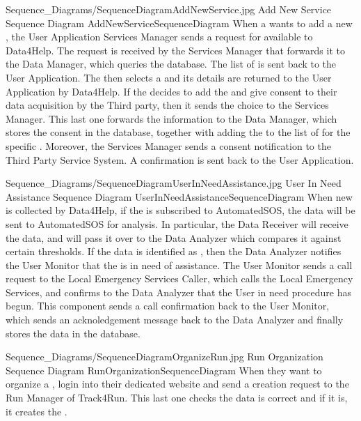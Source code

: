 \documentclass[../../DD.tex]{subfiles}
\begin{document}
	\image {13cm} {Sequence_Diagrams/SequenceDiagramAddNewService.jpg} {Add New Service Sequence Diagram} {AddNewServiceSequenceDiagram}
	When a  wants to add a new , the User Application Services Manager sends a request for available  to Data4Help. The request is received by the Services Manager that forwards it to the Data Manager, which queries the database. The list of  is sent back to the User Application. The  then selects a  and its details are returned to the User Application by Data4Help. If the  decides to add the  and give consent to their data acquisition by the Third party, then it sends the choice to the Services Manager. This last one forwards the information to the Data Manager, which stores the consent in the database, together with adding the  to the list of  for the specific . Moreover, the Services Manager sends a consent notification to the Third Party Service System. A confirmation is sent back to the User Application.



	\image {13cm} {Sequence_Diagrams/SequenceDiagramUserInNeedAssistance.jpg} {User In Need Assistance Sequence Diagram} {UserInNeedAssistanceSequenceDiagram}
	When new  is collected by Data4Help, if the  is subscribed to AutomatedSOS, the data will be sent to AutomatedSOS for analysis. In particular, the Data Receiver will receive the data, and will pass it over to the Data Analyzer which compares it against certain thresholds. If the data is identified as , then the Data Analyzer notifies the User Monitor that the  is in need of assistance. The User Monitor sends a call request to the Local Emergency Services Caller, which calls the Local Emergency Services, and confirms to the Data Analyzer that the User in need procedure has begun. This component sends a call confirmation back to the User Monitor, which sends an acknoledgement message back to the Data Analyzer and finally stores the  data in the database.
	

	\image {13cm} {Sequence_Diagrams/SequenceDiagramOrganizeRun.jpg} {Run Organization Sequence Diagram} {RunOrganizationSequenceDiagram}
	When they want to organize a ,  login into their dedicated website and send a  creation request to the Run Manager of Track4Run. This last one checks the  data is correct and if it is, it creates the .
\end{document}
